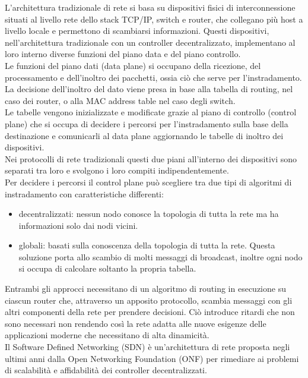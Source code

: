 L'architettura tradizionale di rete si basa su dispositivi fisici di interconnessione situati al livello rete dello stack TCP/IP, switch e router, che collegano più host a livello locale e permettono di scambiarsi informazioni.
Questi dispositivi, nell'architettura tradizionale con un controller decentralizzato, implementano al loro interno diverse funzioni del piano data e del piano controllo. 
\\Le funzioni del piano dati (data plane) si occupano della ricezione, del processamento e dell'inoltro dei pacchetti, ossia ciò che serve per l'instradamento. La decisione dell'inoltro del dato 
viene presa in base alla tabella di routing, nel caso dei router, o alla MAC address table nel caso degli switch. 
\\Le tabelle vengono inizializzate e modificate grazie al piano di controllo (control plane) che si occupa di decidere i percorsi 
per l'instradamento sulla base della destinazione e comunicarli al data plane aggiornando le tabelle di inoltro dei dispositivi. 
\\Nei protocolli di rete tradizionali questi due piani all'interno dei dispositivi sono separati tra loro e svolgono i loro compiti indipendentemente.
\\Per decidere i percorsi il control plane può scegliere tra due tipi di algoritmi di instradamento con caratteristiche differenti: 
\begin{itemize}
\item decentralizzati: nessun nodo conosce la topologia di tutta la rete ma ha informazioni solo dai nodi vicini. 
\item globali: basati sulla conoscenza della topologia di tutta la rete. Questa soluzione
porta allo scambio di molti messaggi di broadcast, inoltre ogni
nodo si occupa di calcolare soltanto la propria tabella.
\end{itemize}
Entrambi gli approcci necessitano di un algoritmo di routing in esecuzione su ciascun router che, attraverso un apposito protocollo, 
scambia messaggi con gli altri componenti della rete per prendere decisioni. 
Ciò introduce ritardi che non sono necessari non rendendo così la rete adatta alle nuove esigenze delle applicazioni moderne che necessitano di alta dinamicità.
\\Il Software Defined Networking (SDN) è un'architettura di rete proposta negli ultimi anni dalla Open Networking Foundation (ONF) \cite{ONF} per rimediare ai problemi di scalabilità e affidabilità dei controller decentralizzati.
